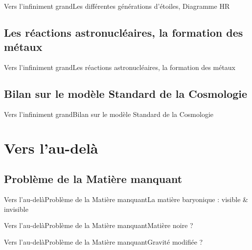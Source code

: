 \documentclass[handout,8pt]{beamer} %
\begin{document}
\begin{frame}{Vers l’infiniment grand}{Les différentes générations d’étoiles, Diagramme HR}

\end{frame}

\subsection{Les réactions astronucléaires, la formation des métaux}
\begin{frame}{Vers l’infiniment grand}{Les réactions astronucléaires, la formation des métaux}

\end{frame}

\subsection{Bilan sur le modèle Standard de la Cosmologie}
\begin{frame}{Vers l’infiniment grand}{Bilan sur le modèle Standard de la Cosmologie}

\end{frame}


\section{Vers l’au-delà}

\begin{frame}
\end{frame}

\subsection{Problème de la Matière manquant}
\begin{frame}{Vers l’au-delà}{Problème de la Matière manquant}{La matière baryonique : visible \& invisible}

\end{frame}

\begin{frame}{Vers l’au-delà}{Problème de la Matière manquant}{Matière noire ?}

\end{frame}

\begin{frame}{Vers l’au-delà}{Problème de la Matière manquant}{Gravité modifiée ?}

\end{frame}
\end{document}
